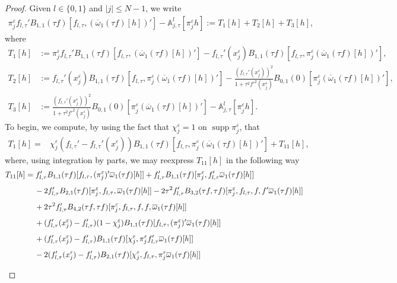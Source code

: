 \documentclass[11pt,reqno]{amsart}
\numberwithin{equation}{section}
\newcommand{\0}{\Omega}
\newcommand{\e}{\varepsilon}
\newcommand{\ov}{\overline}
\newcommand{\oo}{\ov\omega}
\newcommand{\bA}{\mathbb{A}}
\DeclareMathOperator{\supp}{supp}
\numberwithin{equation}{section}
\begin{document}
\begin{proof}
Given $l\in\{0,1\}$ and $|j|\leq N-1$, we write
\begin{align}\label{LL2a}
 \pi_j^\e f_{l,\tau}'B_{1,1}(\tau f)[f_{l,\tau},(\oo_1(\tau f)[h])']-\bA^l_{j,\tau}[\pi^\e_j h]:=T_1[h]+T_2[h]+T_3[h],
\end{align}
where 
\begin{align*}
T_1[h]&:= \pi_j^\e f_{l,\tau}'B_{1,1}(\tau f)[f_{l,\tau},(\oo_1(\tau f)[h])'] - f_{l,\tau}'(x_j^\e)B_{1,1}(\tau f)  [f_{l,\tau},\pi^\e_j(\oo_1(\tau f)[h])' ], \\[1ex]
T_2[h]&:= f_{l,\tau}'(x_j^\e)B_{1,1}(\tau f)[f_{l,\tau},\pi^\e_j(\oo_1(\tau f)[h])']-\frac{(f_{l,\tau}'(x_j^\e))^2}{1+\tau^2 f'^2(x_j^\e)}B_{0,1}(0)  [\pi^\e_j(\oo_1(\tau f)[h])' ],\\[1ex]
T_3[h]&:= \frac{(f_{l,\tau}'(x_j^\e))^2}{1+\tau^2 f'^2(x_j^\e)}B_{0,1}(0)  [\pi^\e_j(\oo_1(\tau f)[h])' ]-\bA^l_{j,\tau}[\pi^\e_j h].
\end{align*}
To begin, we compute, by using   the fact that $\chi_j^\e=1$ on $\supp\pi_j^\e$, that
\begin{align}\label{LL2w}
 T_1[h]=&\chi_j^\e(f_{l,\tau}'-f_{l,\tau}'(x_j^\e))B_{1,1}(\tau f)  [f_{l,\tau},\pi^\e_j(\oo_1(\tau f)[h])' ]+T_{11}[h],
\end{align}
where, using integration by parts, we may reexpress $T_{11}[h]$ in the following way
\begin{align*}
 T_{11}[h]&=f_{l,\tau}'B_{1,1}(\tau f)  [f_{l,\tau},(\pi_j^\e)'\oo_1(\tau f)[h] ]+f_{l,\tau}'B_{1,1}(\tau f)  [\pi_j^\e,f_{l,\tau}'\oo_1(\tau f)[h]]\\[1ex]
 &\hspace{0.424cm}-2f_{l,\tau}'B_{2,1}( \tau f)  [\pi_j^\e,f_{l,\tau},\oo_1(\tau f)[h]]-2\tau^2 f_{l,\tau}'B_{3,2}(\tau f, \tau f)  [\pi_j^\e,f_{l,\tau},f,f' \oo_1(\tau f)[h]]\\[1ex]
 &\hspace{0.424cm}+2\tau^2 f_{l,\tau}'B_{4,2}(\tau f, \tau f)  [\pi_j^\e,f_{l,\tau},f,f, \oo_1(\tau f)[h]]\\[1ex]
 &\hspace{0.424cm}+(f_{l,\tau}'(x_j^\e)-f_{l,\tau}')(1-\chi_j^\e)B_{1,1}(\tau f)  [f_{l,\tau},(\pi_j^\e)'\oo_1(\tau f)[h]]\\[1ex]
 &\hspace{0.424cm}+(f_{l,\tau}'(x_j^\e)-f_{l,\tau}')B_{1,1}(\tau f)  [\chi_j^\e,\pi_j^\e f_{l,\tau}'\oo_1(\tau f)[h]]\\[1ex]
 &\hspace{0.424cm}-2(f_{l,\tau}'(x_j^\e)-f_{l,\tau}')B_{2,1}( \tau f)  [\chi_j^\e,f_{l,\tau},\pi_j^\e \oo_1(\tau f)[h]]\\[1ex]

\end{align*}
\end{proof}
\end{document}

